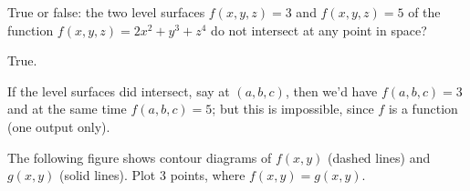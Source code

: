 \begin{question}
True or false: the two level surfaces $f(x,y,z)=3$ and $f(x,y,z)=5$ of the function $f(x,y,z)=2x^2 + y^3 + z^4$ do not intersect at any point in space?
\end{question}

\begin{solution}
True.

If the level surfaces did intersect, say at $(a,b,c)$, then we'd have $f(a,b,c)=3$ and at the same time $f(a,b,c)=5$; but this is impossible, since $f$ is a function (one output only).
\end{solution}

\begin{question}
The following figure shows contour diagrams of $f(x,y)$ (dashed lines) and $g(x,y)$ (solid lines). Plot 3 points, where $f(x,y) = g(x,y)$.

\begin{center}
\end{center}
\end{question}


